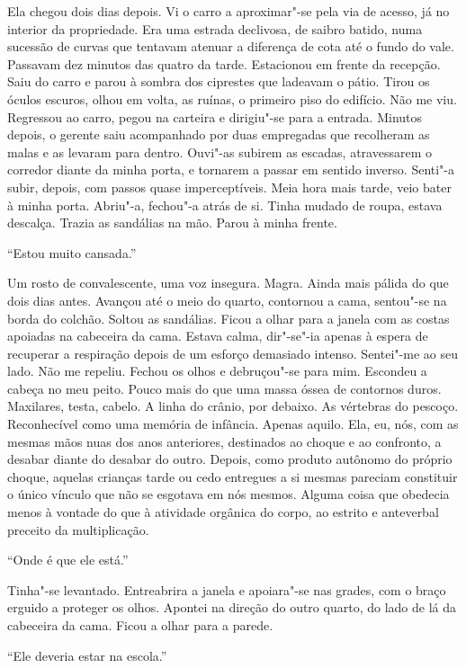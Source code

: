 Ela chegou dois dias depois. Vi o carro a aproximar"-se pela via de
acesso, já no interior da propriedade. Era uma estrada declivosa, de
saibro batido, numa sucessão de curvas que tentavam atenuar a diferença
de cota até o fundo do vale. Passavam dez minutos das quatro da tarde.
Estacionou em frente da recepção. Saiu do carro e parou à sombra dos
ciprestes que ladeavam o pátio. Tirou os óculos escuros, olhou em volta,
as ruínas, o primeiro piso do edifício. Não me viu. Regressou ao carro,
pegou na carteira e dirigiu"-se para a entrada. Minutos depois, o
gerente saiu acompanhado por duas empregadas que recolheram as malas e
as levaram para dentro. Ouvi"-as subirem as escadas, atravessarem o
corredor diante da minha porta, e tornarem a passar em sentido inverso.
Senti"-a subir, depois, com passos quase imperceptíveis. Meia hora mais
tarde, veio bater à minha porta. Abriu"-a, fechou"-a atrás de si. Tinha
mudado de roupa, estava descalça. Trazia as sandálias na mão. Parou à
minha frente.

``Estou muito cansada.''

Um rosto de convalescente, uma voz insegura. Magra. Ainda mais pálida do
que dois dias antes. Avançou até o meio do quarto, contornou a cama,
sentou"-se na borda do colchão. Soltou as sandálias. Ficou a olhar para
a janela com as costas apoiadas na cabeceira da cama. Estava calma,
dir"-se"-ia apenas à espera de recuperar a respiração depois de um
esforço demasiado intenso. Sentei"-me ao seu lado. Não me repeliu.
Fechou os olhos e debruçou"-se para mim. Escondeu a cabeça no meu peito.
Pouco mais do que uma massa óssea de contornos duros. Maxilares, testa,
cabelo. A linha do crânio, por debaixo. As vértebras do pescoço.
Reconhecível como uma memória de infância. Apenas aquilo. Ela, eu, nós,
com as mesmas mãos nuas dos anos anteriores, destinados ao choque e ao
confronto, a desabar diante do desabar do outro. Depois, como produto
autônomo do próprio choque, aquelas crianças tarde ou cedo entregues a
si mesmas pareciam constituir o único vínculo que não se esgotava em nós
mesmos. Alguma coisa que obedecia menos à vontade do que à atividade
orgânica do corpo, ao estrito e anteverbal preceito da multiplicação.

``Onde é que ele está.''

Tinha"-se levantado. Entreabrira a janela e apoiara"-se nas grades, com
o braço erguido a proteger os olhos. Apontei na direção do outro
quarto, do lado de lá da cabeceira da cama. Ficou a olhar para a parede.

``Ele deveria estar na escola.''

